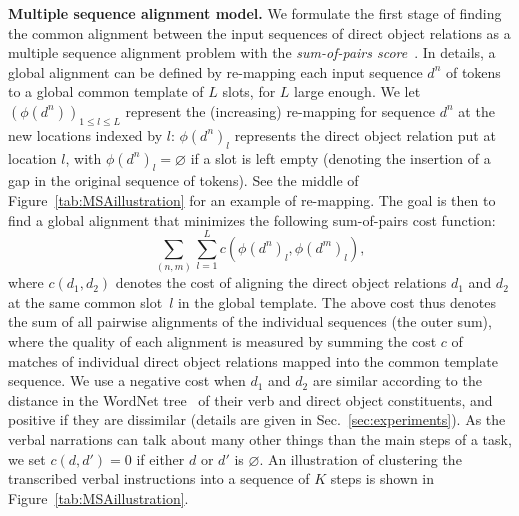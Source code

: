 \documentclass[10pt,twocolumn,letterpaper]{article}
\begin{document}
\textbf{Multiple sequence alignment model.} We formulate the first stage of finding the common alignment between the input sequences of direct object relations as a multiple sequence alignment problem with the \emph{sum-of-pairs score}~\cite{wang1994msaNPhard}. 
In details, a global alignment can be defined by re-mapping each input sequence $d^n$ of tokens to a global common template of $L$ slots, for $L$ large enough. We let $(\phi(d^n))_{1\leq l \leq L}$ represent
the (increasing) re-mapping for sequence $d^n$ at the new locations indexed by $l$:  $\phi(d^n)_l$ represents the direct object relation put at location $l$, with $\phi(d^n)_l = \varnothing$ if a slot is left empty (denoting the insertion of a gap in the original sequence of tokens). See the middle of Figure~\ref{tab:MSAillustration} for an example of re-mapping.
The goal is then to find a global alignment that minimizes the following sum-of-pairs cost function:
\vspace{-3mm}
\begin{equation}
\sum_{(n,m)} \sum_{l=1}^L c(\phi(d^n)_l,\phi(d^{m})_{l}),
\label{eq:msa_cost}
\end{equation}
where $c(d_1,d_2)$ denotes the cost of aligning the direct object relations $d_1$ and $d_2$ at the same common slot~$l$ in the global template. The above cost thus denotes the sum of all pairwise alignments of the individual sequences (the outer sum), where the quality of each alignment is measured by summing the cost $c$ of matches of individual direct object relations mapped into the common template sequence. We use a negative cost when $d_1$ and $d_2$ 
%
%
%
%
%
%
are similar according to the distance in the WordNet tree~\cite{Fellbaum98Wordnet,Miller95Wordnet} of their verb and direct object constituents, and positive if they are dissimilar (details are given in 
Sec.~\ref{sec:experiments}).
As the verbal narrations can talk about many other things than the main steps of a task,
we set $c(d,d')=0$ if either $d$ or $d'$ is $\varnothing$.
An illustration of clustering the transcribed verbal instructions into a sequence of $K$ steps is shown in Figure~\ref{tab:MSAillustration}.
%
%
\end{document}

